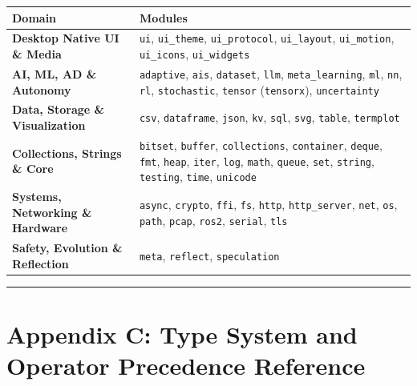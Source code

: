 \documentclass[
  english,
  oneside]{book}
\newcounter{none} %
\begin{document}
{\def\LTcaptype{none} %
\begin{longtable}[]{@{}
  >{\raggedright\arraybackslash}p{}
  >{\raggedright\arraybackslash}p{}@{}}
\toprule\noalign{}
\begin{minipage}[b]{\linewidth}\raggedright
Domain
\end{minipage} & \begin{minipage}[b]{\linewidth}\raggedright
Modules
\end{minipage} \\
\midrule\noalign{}
\endhead
\bottomrule\noalign{}
\endlastfoot
\textbf{Desktop Native UI \& Media} & \texttt{ui}, \texttt{ui\_theme},
\texttt{ui\_protocol}, \texttt{ui\_layout}, \texttt{ui\_motion},
\texttt{ui\_icons}, \texttt{ui\_widgets} \\
\textbf{AI, ML, AD \& Autonomy} & \texttt{adaptive}, \texttt{ais},
\texttt{dataset}, \texttt{llm}, \texttt{meta\_learning}, \texttt{ml},
\texttt{nn}, \texttt{rl}, \texttt{stochastic}, \texttt{tensor}
(\texttt{tensorx}), \texttt{uncertainty} \\
\textbf{Data, Storage \& Visualization} & \texttt{csv},
\texttt{dataframe}, \texttt{json}, \texttt{kv}, \texttt{sql},
\texttt{svg}, \texttt{table}, \texttt{termplot} \\
\textbf{Collections, Strings \& Core} & \texttt{bitset},
\texttt{buffer}, \texttt{collections}, \texttt{container},
\texttt{deque}, \texttt{fmt}, \texttt{heap}, \texttt{iter},
\texttt{log}, \texttt{math}, \texttt{queue}, \texttt{set},
\texttt{string}, \texttt{testing}, \texttt{time}, \texttt{unicode} \\
\textbf{Systems, Networking \& Hardware} & \texttt{async},
\texttt{crypto}, \texttt{ffi}, \texttt{fs}, \texttt{http},
\texttt{http\_server}, \texttt{net}, \texttt{os}, \texttt{path},
\texttt{pcap}, \texttt{ros2}, \texttt{serial}, \texttt{tls} \\
\textbf{Safety, Evolution \& Reflection} & \texttt{meta},
\texttt{reflect}, \texttt{speculation} \\
\end{longtable}
}

\begin{center}\rule{0.5\linewidth}{0.5pt}\end{center}

\chapter{Appendix C: Type System and Operator Precedence
Reference}\label{appendix-c-type-system-and-operator-precedence-reference}
\end{document}
